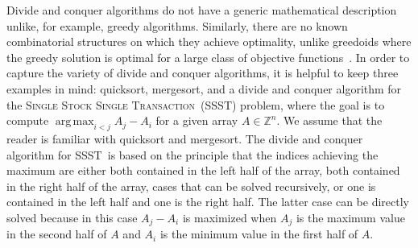 \documentclass[12pt]{article}
\DeclareMathOperator*{\argmax}{arg\,max}
\newcommand{\SSSTf}{\textsc{Single Stock Single Transaction}}
\newcommand{\SSST}{\textsc{SSST}}
\theoremstyle{definition}
\begin{document}
Divide and conquer algorithms do not have a generic mathematical description unlike, for example, greedy algorithms.
Similarly, there are no known combinatorial structures on which they achieve optimality, unlike greedoids where the greedy solution is optimal for a large class of objective functions~\cite{KL84}. 
In order to capture the variety of divide and conquer algorithms, it is helpful to keep three examples in mind: quicksort, mergesort, and a divide and conquer algorithm for the \SSSTf\ (\SSST) problem, where the goal is to compute $\argmax_{i < j} A_j - A_i$ for a given array $A \in \mathbb{Z}^n$.  
We assume that the reader is familiar with quicksort and mergesort.  
The divide and conquer algorithm for \SSST\ is based on the principle that the indices achieving the maximum are either both 
contained in the left half of the array, both contained in the right half of the array, cases that can be solved recursively, or one is contained in the left half and one is the right half. The latter case can be directly solved because in this case $A_j - A_i$ is maximized when $A_j$ is the maximum value in the second half of $A$ and $A_i$ is the minimum value in the first half of $A$. 
\end{document}
